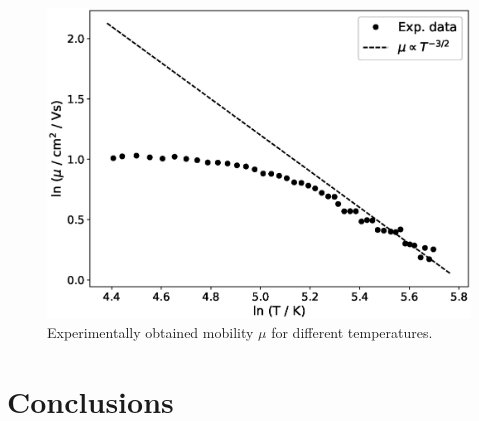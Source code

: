 \documentclass[11pt,a4paper]{article}
\begin{document}
\begin{figure}[H]
\centering
\includegraphics[width=.7\textwidth]{Hall_mobility.eps}
\caption{Experimentally obtained mobility $\mu$ for different temperatures.}
\label{fig:hall_mobility}
\end{figure}

\section{Conclusions}



\nocite{*}
\vfill


\end{document}
